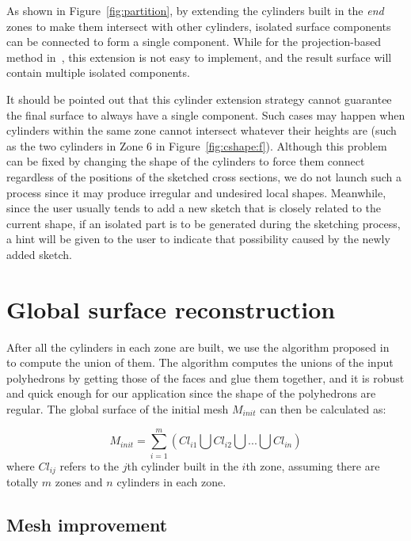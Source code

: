 As shown in Figure~\ref{fig:partition}, by extending the  cylinders
built in the \textit{end} zones to make them intersect with other
cylinders, isolated surface components can be connected to form a
single component. While for the projection-based method
in~\cite{LBDLJ08}, this extension is not easy to implement, and the
result surface will contain multiple isolated components.

It should be pointed out that this cylinder extension  strategy
cannot guarantee the final surface to always have a single
component. Such cases may happen when cylinders within the same zone
cannot intersect whatever their heights are (such as the two
cylinders in Zone 6 in Figure~\ref{fig:cshape:f}). Although this
problem can be fixed by changing the shape of the cylinders to force
them connect regardless of the positions of the sketched cross
sections, we do not launch such a process since it may produce
irregular and undesired local shapes. Meanwhile, since the user
usually tends to add a new sketch that is closely related to the
current shape, if an isolated part is to be generated during the
sketching process, a hint will be given to the user to indicate that
possibility caused by the newly added sketch.


\section{Global surface reconstruction} \label{ch4:sec:algo:global}

After all the cylinders in each zone are built, we use the algorithm
proposed in~\cite{LTH86} to compute the union of them. The algorithm
computes the unions of the input polyhedrons by getting those of the
faces and glue them together, and it is robust and quick enough for
our application since the shape of the polyhedrons are regular. The
global surface of the initial mesh $M_{init}$ can then be calculated
as:

\begin{equation}
\label{eq:surfreconstortho}
    M_{init}=\sum\limits_{i=1}^m {(Cl_{i1} \bigcup Cl_{i2} \bigcup {...} \bigcup Cl_{in})}
\end{equation}
where $Cl_{ij}$ refers to the $j$th cylinder built in  the $i$th
zone, assuming there are totally $m$ zones and $n$ cylinders in each
zone.

\subsection{Mesh improvement}
\label{ch4:sec:algo:global:improve}

